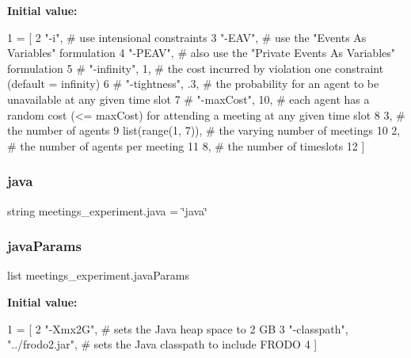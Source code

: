 {\bfseries Initial value\+:}
\begin{DoxyCode}
1 =  [
2             \textcolor{stringliteral}{"-i"},                \textcolor{comment}{# use intensional constraints}
3             \textcolor{stringliteral}{"-EAV"},          \textcolor{comment}{# use the "Events As Variables" formulation}
4             \textcolor{stringliteral}{"-PEAV"},             \textcolor{comment}{# also use the "Private Events As Variables" formulation}
5 \textcolor{comment}{#            "-infinity", 1,     # the cost incurred by violation one constraint (default = infinity)}
6 \textcolor{comment}{#           "-tightness", .3,    # the probability for an agent to be unavailable at any given time slot}
7 \textcolor{comment}{#            "-maxCost", 10,     # each agent has a random cost (<= maxCost) for attending a meeting at any
       given time slot}
8             3,                   \textcolor{comment}{# the number of agents}
9             list(range(1, 7)),   \textcolor{comment}{# the varying number of meetings}
10             2,                   \textcolor{comment}{# the number of agents per meeting}
11             8,                   \textcolor{comment}{# the number of timeslots}
12             ]
\end{DoxyCode}
\mbox{\label{namespacemeetings__experiment_a8470b61efa2bb39406b0b1f11c223db8}} 
\subsubsection{\texorpdfstring{java}{java}}
{\footnotesize\ttfamily string meetings\+\_\+experiment.\+java = \char`\"{}java\char`\"{}}

\mbox{\label{namespacemeetings__experiment_a77e443fc7411b80fcd69dba9f6895216}} 
\subsubsection{\texorpdfstring{java\+Params}{javaParams}}
{\footnotesize\ttfamily list meetings\+\_\+experiment.\+java\+Params}

{\bfseries Initial value\+:}
\begin{DoxyCode}
1 =  [
2             \textcolor{stringliteral}{"-Xmx2G"}, \textcolor{comment}{# sets the Java heap space to 2 GB}
3             \textcolor{stringliteral}{"-classpath"}, \textcolor{stringliteral}{"../frodo2.jar"}, \textcolor{comment}{# sets the Java classpath to include FRODO}
4             ]
\end{DoxyCode}
\mbox{\label{namespacemeetings__experiment_aa9963d5b365b9cb5d32d58f1e64237aa}} 
